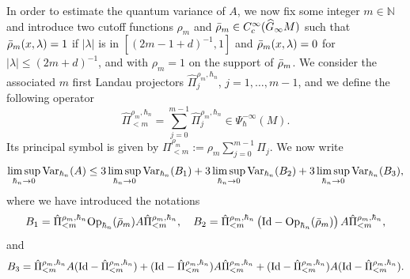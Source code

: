 \documentclass[12pt,a4paper]{amsart}
\theoremstyle{plain}
\theoremstyle{definition}
\theoremstyle{remark}
\numberwithin{equation}{section}
\theoremstyle{definition}
\def\N{{\mathbb N}}%
\def \Op{{\rm Op}}
\def \Ghat{\widehat{G}}
\numberwithin{equation}{section}
\begin{document}
\vspace{0.25cm}
    
In order to estimate the quantum variance of $A$, we now fix some integer $m\in \N$ and introduce two cutoff functions $\rho_m$ and $\Bar{\rho}_m\in C_c^\infty(\Ghat_\infty M)$ such that $\Bar{\rho}_m(x,\lambda) = 1$ if $|\lambda|$ is in $[(2m-1+d)^{-1},1]$ and $\Bar{\rho}_m(x,\lambda) = 0$ for $|\lambda|\leq (2m+d)^{-1}$, and with $\rho_m = 1$ on the support of $\Bar{\rho}_m$. We consider the associated $m$ first Landau projectors $\hat{\Pi}_j^{\rho_m,\hbar_n}$, $j=1,\dots,m-1$, and we define the following operator
\begin{equation*}
    \hat{\Pi}_{<m}^{\rho_m,\hbar_n} = \sum_{j=0}^{m-1} \hat{\Pi}_j^{\rho_m,\hbar_n} \in \Psi_\hbar^{-\infty}(M).
\end{equation*}
Its principal symbol is given by $\Pi_{<m}^{\rho_m} := \rho_m \sum_{j=0}^{m-1}\Pi_j$.
We now write
\begin{equation}
    \label{eq:decompositionvarA}
    \limsup_{\hbar_n\rightarrow 0}{\rm Var}_{\hbar_n}(A) \leq 3\limsup_{\hbar_n\rightarrow 0}{\rm Var}_{\hbar_n}(B_1)+3\limsup_{\hbar_n\rightarrow 0}{\rm Var}_{\hbar_n}(B_2)+3\limsup_{\hbar_n\rightarrow 0}{\rm Var}_{\hbar_n}(B_3),
\end{equation}
where we have introduced the notations
\begin{equation*}
    B_1 = \hat{\Pi}_{<m}^{\rho_m,\hbar_n}\Op_{\hbar_n}(\Bar{\rho}_m)A\hat{\Pi}_{<m}^{\rho_m,\hbar_n},\quad B_2 =  \hat{\Pi}_{<m}^{\rho_m,\hbar_n}\left({\rm Id}-\Op_{\hbar_n}(\Bar{\rho}_m)\right)A\hat{\Pi}_{<m}^{\rho_m,\hbar_n},
\end{equation*}
and 
\begin{equation*}
    B_3 = \hat{\Pi}_{<m}^{\rho_m,\hbar_n} A({\rm Id}-\hat{\Pi}_{<m}^{\rho_m,\hbar_n}) + ({\rm Id}-\hat{\Pi}_{<m}^{\rho_m,\hbar_n})A \hat{\Pi}_{<m}^{\rho_m,\hbar_n} + ({\rm Id}-\hat{\Pi}_{<m}^{\rho_m,\hbar_n})A({\rm Id}-\hat{\Pi}_{<m}^{\rho_m,\hbar_n}).
\end{equation*}

\vspace{0.25cm}
\end{document}
